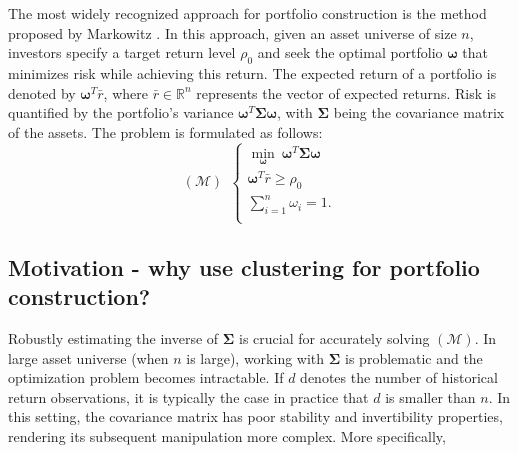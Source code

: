 \documentclass[sigconf]{acmart}
\begin{document}
The most widely recognized approach for portfolio construction is the method proposed by Markowitz \cite{MarkowitzPO}. In this approach, given an asset universe of size \( n \), investors specify a target return level \( \rho_0 \) and seek the optimal portfolio \( \boldsymbol{\omega} \) that minimizes risk while achieving this return. The expected return of a portfolio is denoted by \( \boldsymbol{\omega}^T \bar{r} \), where \( \bar{r} \in \mathbb{R}^n \) represents the vector of expected returns. Risk is quantified by the portfolio's variance \( \boldsymbol{\omega}^T \boldsymbol{\Sigma} \boldsymbol{\omega} \), with \( \boldsymbol{\Sigma} \) being the covariance matrix of the assets. The problem is formulated as follows:
\begin{equation*}
    (\boldsymbol{\mathcal{M}}) ~~
    \left\{
        \begin{array}{ll}
            \underset{\boldsymbol{\omega}}{\min} ~ \boldsymbol{\omega}^T\boldsymbol{\Sigma}\boldsymbol{\omega} \\
            \boldsymbol{\omega}^T \bar{r} \geq \rho_0\\
            \sum_{i=1}^n \omega_i = 1.    \\
        \end{array}
    \right.
    \label{markowitzproblem}
\end{equation*}



\subsection{Motivation - why use clustering for portfolio construction?}

Robustly estimating the inverse of $\boldsymbol{\Sigma}$ is crucial for accurately solving $(\boldsymbol{\mathcal{M}})$. In large asset universe (when $n$ is large), working with $\boldsymbol{\Sigma}$ is problematic and the optimization problem becomes intractable. If $d$ denotes the number of historical return observations, it is typically the case in practice that $d$ is smaller than $n$. In this setting, the covariance matrix has poor stability and invertibility properties, rendering its subsequent manipulation more complex. More specifically,
\end{document}
